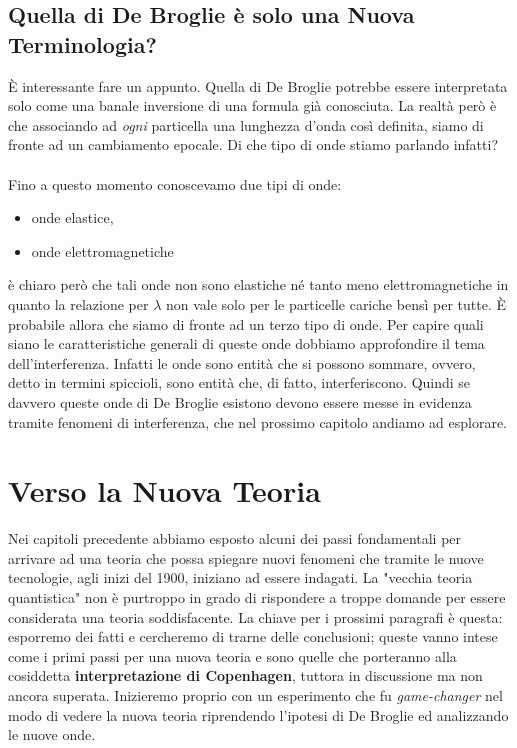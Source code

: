 \subsection{Quella di De Broglie è solo una Nuova Terminologia?}

	È interessante fare un appunto. Quella di De Broglie potrebbe essere interpretata solo come una banale inversione di una formula già conosciuta. La realtà però è che associando ad \textit{ogni} particella una lunghezza d'onda così definita, siamo di fronte ad un cambiamento epocale. Di che tipo di onde stiamo parlando infatti?
	\\
	\\
	Fino a questo momento conoscevamo due tipi di onde:
\begin{itemize}
	\item onde elastice,
	\item onde elettromagnetiche
\end{itemize} 
	è chiaro però che tali onde non sono elastiche né tanto meno elettromagnetiche in quanto la relazione per $\lambda$ non vale solo per le particelle cariche bensì per tutte. È probabile allora che siamo di fronte ad un terzo tipo di onde. Per capire quali siano le caratteristiche generali di queste onde dobbiamo approfondire il tema dell'interferenza. Infatti le onde sono entità che si possono sommare, ovvero, detto in termini spiccioli, sono entità che, di fatto, interferiscono. Quindi se davvero queste onde di De Broglie esistono devono essere messe in evidenza tramite fenomeni di interferenza, che nel prossimo capitolo andiamo ad esplorare.
	
\section{Verso la Nuova Teoria}

	Nei capitoli precedente abbiamo esposto alcuni dei passi fondamentali per arrivare ad una teoria che possa spiegare nuovi fenomeni che tramite le nuove tecnologie, agli inizi del 1900, iniziano ad essere indagati. La "vecchia teoria quantistica" non è purtroppo in grado di rispondere a troppe domande per essere considerata una teoria soddisfacente. La chiave per i prossimi paragrafi è questa: esporremo dei fatti e cercheremo di trarne delle conclusioni; queste vanno intese come i primi passi per una nuova teoria e sono quelle che porteranno alla cosiddetta \textbf{interpretazione di Copenhagen}, tuttora in discussione ma non ancora superata. Inizieremo proprio con un esperimento che fu \textit{game-changer} nel modo di vedere la nuova teoria riprendendo l'ipotesi di De Broglie ed analizzando le nuove onde.
	
